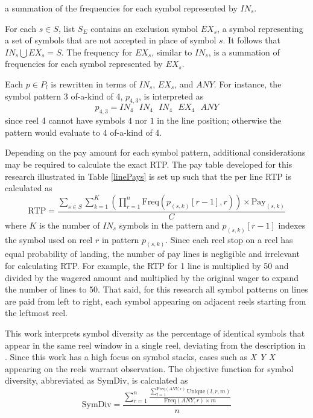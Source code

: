 \documentclass[conference]{IEEEtran}
\begin{document}
a summation of the frequencies for each symbol represented by $IN_s$.
\par
For each $s \in S$, list $S_E$ contains an exclusion symbol $EX_s$, a symbol representing a set of symbols that are not accepted in place of symbol $s$.
It follows that $IN_s \bigcup EX_s = S$. 
The frequency for $EX_s$, similar to $IN_s$, is a summation of frequencies for each symbol represented by $EX_s$.
\par
Each $p\in P_l$ is rewritten in terms of $IN_s$, $EX_s$, and $ANY$.
For instance, the symbol pattern 3 of-a-kind of 4, $p_{4,3}$, is interpreted as
\begin{equation}
p_{4,3} = IN_4 \text{ } IN_4\text{ } IN_4 \text{ }EX_4\text{ } ANY
\end{equation}
since reel 4 cannot have symbols $4$ nor $1$ in the line position; otherwise the pattern would evaluate to 4 of-a-kind of 4.
\par
Depending on the pay amount for each symbol pattern, additional considerations may be required to calculate the exact RTP.
The pay table developed for this research illustrated in Table \ref{linePays} is set up such that the per line RTP is calculated as
\begin{equation}
\text{RTP} = \frac{\sum_{s \in S}\sum_{k = 1}^{K}(\prod_{r = 1}^{n} \text{Freq}(p_{(s,k)}[r-1],r))\times \text{Pay}_{(s,k)}}{C}
\end{equation}
where $K$ is the number of $IN_s$ symbols in the pattern and $p_{(s,k)}[r-1]$ indexes the symbol used on reel $r$ in pattern $p_{(s,k)}$.
Since each reel stop on a reel has equal probability of landing, the number of pay lines is negligible and irrelevant for calculating RTP.
For example, the RTP for 1 line is multiplied by 50 and divided by the wagered amount and multiplied by the original wager to expand the number of lines to 50.
That said, for this research all symbol patterns on lines are paid from left to right, each symbol appearing on adjacent reels starting from the leftmost reel.
\par
This work interprets symbol diversity as the percentage of identical symbols that appear in the same reel window in a single reel, deviating from the description in \cite{balabanovDDE}. Since this work has a high focus on symbol stacks, cases such as \textit{X Y X} appearing on the reels warrant observation. The objective function for symbol diversity, abbreviated as SymDiv, is calculated as
\begin{equation}
\text{SymDiv} = \frac{\sum_{r=1}^{n}\frac{\sum_{l=1}^{\text{Freq}(ANY,r)}\text{Unique}(l,r,m)}{\text{Freq}(ANY,r)\times m}}{n}
\end{equation}
\end{document}
